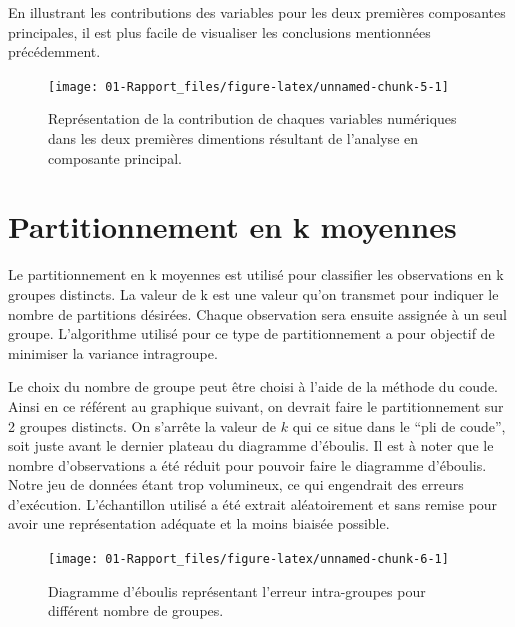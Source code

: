 \documentclass[
]{article}
\begin{document}
En illustrant les contributions des variables pour les deux premières
composantes principales, il est plus facile de visualiser les
conclusions mentionnées précédemment.

\begin{figure}

{\centering \texttt{[image: 01-Rapport\_files/figure-latex/unnamed-chunk-5-1]} 

}

\caption{Représentation de la contribution de chaques variables numériques dans les deux premières dimentions résultant de l'analyse en composante principal.}\label{fig:unnamed-chunk-5}
\end{figure}

\newpage

\hypertarget{partitionnement-en-k-moyennes}{%
\section{Partitionnement en k
moyennes}\label{partitionnement-en-k-moyennes}}

Le partitionnement en k moyennes est utilisé pour classifier les
observations en k groupes distincts. La valeur de k est une valeur qu'on
transmet pour indiquer le nombre de partitions désirées. Chaque
observation sera ensuite assignée à un seul groupe. L'algorithme utilisé
pour ce type de partitionnement a pour objectif de minimiser la variance
intragroupe.

Le choix du nombre de groupe peut être choisi à l'aide de la méthode du
coude. Ainsi en ce référent au graphique suivant, on devrait faire le
partitionnement sur 2 groupes distincts. On s'arrête la valeur de \(k\)
qui ce situe dans le ``pli de coude'', soit juste avant le dernier
plateau du diagramme d'éboulis. Il est à noter que le nombre
d'observations a été réduit pour pouvoir faire le diagramme d'éboulis.
Notre jeu de données étant trop volumineux, ce qui engendrait des
erreurs d'exécution. L'échantillon utilisé a été extrait aléatoirement
et sans remise pour avoir une représentation adéquate et la moins
biaisée possible.

\begin{figure}

{\centering \texttt{[image: 01-Rapport\_files/figure-latex/unnamed-chunk-6-1]} 

}

\caption{Diagramme d'éboulis représentant l'erreur intra-groupes pour différent nombre de groupes.}\label{fig:unnamed-chunk-6}
\end{figure}
\end{document}
